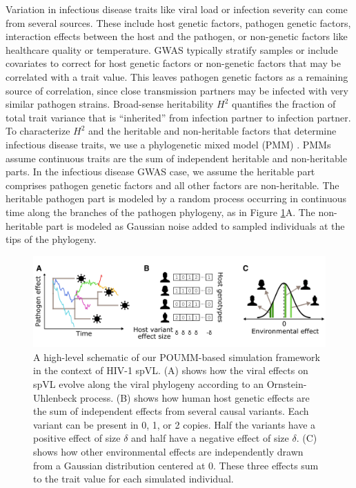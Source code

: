 \documentclass[11pt]{article}
\begin{document}
\begin{linenumbers}
Variation in infectious disease traits like viral load or infection severity can come from several sources. These include host genetic factors, pathogen genetic factors, interaction effects between the host and the pathogen, or non-genetic factors like healthcare quality or temperature. GWAS typically stratify samples or include covariates to correct for host genetic factors or non-genetic factors that may be correlated with a trait value. This leaves pathogen genetic factors as a remaining source of correlation, since close transmission partners may be infected with very similar pathogen strains. Broad-sense heritability $H^2$ quantifies the fraction of total trait variance that is ``inherited'' from infection partner to infection partner. To characterize $H^2$ and the heritable and non-heritable factors that determine infectious disease traits, we use a phylogenetic mixed model (PMM) \citep{Housworth2004}. PMMs assume continuous traits are the sum of independent heritable and non-heritable parts. In the infectious disease GWAS case, we assume the heritable part comprises pathogen genetic factors and all other factors are non-heritable. The heritable pathogen part is modeled by a random process occurring in continuous time along the branches of the pathogen phylogeny, as in Figure \ref{fig:spVLModel}A. The non-heritable part is modeled as Gaussian noise added to sampled individuals at the tips of the phylogeny.

\begin{figure}[H]
	\begin{center}
	\includegraphics[width = \linewidth]{figures/simulation_setup.png}
	\caption{A high-level schematic of our POUMM-based simulation framework in the context of HIV-1 spVL. (A) shows how the viral effects on spVL evolve along the viral phylogeny according to an Ornstein-Uhlenbeck process. (B) shows how human host genetic effects are the sum of independent effects from several causal variants. Each variant can be present in 0, 1, or 2 copies. Half the variants have a positive effect of size $\delta$ and half have a negative effect of size $\delta$. (C) shows how other environmental effects are independently drawn from a Gaussian distribution centered at 0. These three effects sum to the trait value for each simulated individual.}
		\label{fig:spVLModel}
	\end{center}
\end{figure}


\end{linenumbers}
\end{document}
